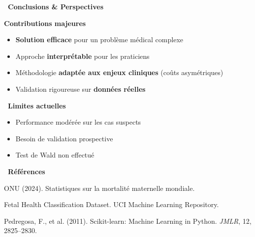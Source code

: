 \documentclass[a0,landscape]{a0poster}
\newcommand{\bigsection}[1]{
  \vspace{0.5cm}
  \begin{tcolorbox}[
    colback=primaryblue,
    coltext=white,
    arc=2mm,
    boxrule=0pt,
    left=10pt,
    right=10pt,
    top=5pt,
    bottom=5pt
  ]
    {\Large\bfseries #1\par}
  \end{tcolorbox}
  \vspace{0.3cm}
}
\newcommand{\checkitem}{\item[\textcolor{accentgreen}{\faCheck}]}
\begin{document}
\begin{multicols}{3}
\bigsection{\faLightbulb\ Conclusions \& Perspectives}

\textbf{\color{primaryblue} Contributions majeures}
\begin{itemize}
  \checkitem \textbf{Solution efficace} pour un problème médical complexe
  \checkitem Approche \textbf{interprétable} pour les praticiens
  \checkitem Méthodologie \textbf{adaptée aux enjeux cliniques} (coûts asymétriques)
  \checkitem Validation rigoureuse sur \textbf{données réelles}
\end{itemize}


\begin{warningbox}
\textbf{\faExclamationTriangle\ Limites actuelles}
\begin{itemize}[leftmargin=1em]
  \item Performance modérée sur les cas suspects
  \item Besoin de validation prospective
  \item Test de Wald non effectué
\end{itemize}
\end{warningbox}


\vspace{0.5cm}

\bigsection{\faBook\ Références}

\begin{enumerate}[label={[\arabic]},itemsep=0.15em,topsep=0.3em]
  \small
  \item ONU (2024). Statistiques sur la mortalité maternelle mondiale.
  
  \item Fetal Health Classification Dataset. UCI Machine Learning Repository.
  
  \item Pedregosa, F., et al. (2011). Scikit-learn: Machine Learning in Python. \emph{JMLR}, 12, 2825–2830.
\end{enumerate}

\end{multicols}
\end{document}
